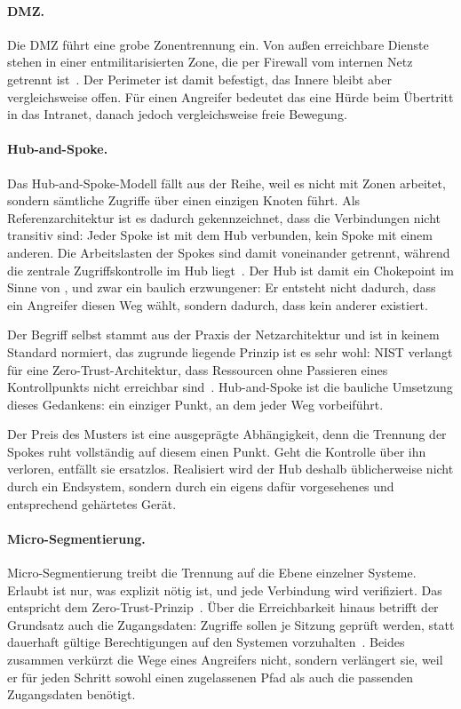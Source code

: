 \paragraph{DMZ.}
Die \ac{DMZ} führt eine grobe Zonentrennung ein. Von außen erreichbare Dienste
stehen in einer entmilitarisierten Zone, die per Firewall vom internen Netz
getrennt ist~\cite{nist800041}. Der Perimeter ist damit befestigt, das Innere
bleibt aber vergleichsweise offen. Für einen Angreifer bedeutet das eine Hürde
beim Übertritt in das Intranet, danach jedoch vergleichsweise freie Bewegung.

\paragraph{Hub-and-Spoke.}
Das Hub-and-Spoke-Modell fällt aus der Reihe, weil es nicht mit Zonen arbeitet,
sondern sämtliche Zugriffe über einen einzigen Knoten führt. Als
Referenzarchitektur ist es dadurch gekennzeichnet, dass die Verbindungen nicht
transitiv sind: Jeder Spoke ist mit dem Hub verbunden, kein Spoke mit einem
anderen. Die Arbeitslasten der Spokes sind damit voneinander getrennt, während
die zentrale Zugriffskontrolle im Hub liegt~\cite{mshubspoke}. Der Hub ist
damit ein Chokepoint im Sinne von , und zwar
ein baulich erzwungener: Er entsteht nicht dadurch, dass ein Angreifer diesen
Weg wählt, sondern dadurch, dass kein anderer existiert.

Der Begriff selbst stammt aus der Praxis der Netzarchitektur und ist in keinem
Standard normiert, das zugrunde liegende Prinzip ist es sehr wohl: \ac{NIST}
verlangt für eine Zero-Trust-Architektur, dass Ressourcen ohne Passieren eines
Kontrollpunkts nicht erreichbar sind~\cite[Abschn.~3.4.1]{nist800207}.
Hub-and-Spoke ist die bauliche Umsetzung dieses Gedankens: ein einziger Punkt,
an dem jeder Weg vorbeiführt.

Der Preis des Musters ist eine ausgeprägte Abhängigkeit, denn die Trennung der
Spokes ruht vollständig auf diesem einen Punkt. Geht die Kontrolle über ihn
verloren, entfällt sie ersatzlos. Realisiert wird der Hub deshalb üblicherweise
nicht durch ein Endsystem, sondern durch ein eigens dafür vorgesehenes und
entsprechend gehärtetes Gerät.

\paragraph{Micro-Segmentierung.}
Micro-Segmentierung treibt die Trennung auf die Ebene einzelner Systeme. Erlaubt
ist nur, was explizit nötig ist, und jede Verbindung wird verifiziert. Das
entspricht dem Zero-Trust-Prinzip~\cite{nist800207}. Über die Erreichbarkeit
hinaus betrifft der Grundsatz auch die Zugangsdaten: Zugriffe sollen je Sitzung
geprüft werden, statt dauerhaft gültige Berechtigungen auf den Systemen
vorzuhalten~\cite[Abschn.~2.1]{nist800207}. Beides zusammen verkürzt die Wege
eines Angreifers nicht, sondern verlängert sie, weil er für jeden Schritt sowohl
einen zugelassenen Pfad als auch die passenden Zugangsdaten benötigt.

